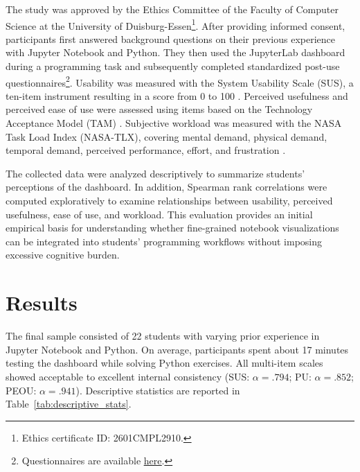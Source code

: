 \documentclass[sigconf]{acmart}
\begin{document}
The study was approved by the Ethics Committee of the Faculty of Computer Science at the University of Duisburg-Essen\footnote{Ethics certificate ID: 2601CMPL2910.}. After providing informed consent, participants first answered background questions on their previous experience with Jupyter Notebook and Python. They then used the JupyterLab dashboard during a programming task and subsequently completed standardized post-use questionnaires\footnote{Questionnaires are available \href{https://git.uni-due.de/colaps/la-rp/group-4/la-extension/-/raw/master/MUC\%20-\%20StudentResearchCompetition/Questionaire.pdf?ref_type=heads&inline=true}{\color{blue}\underline{here}}.}. Usability was measured with the System Usability Scale (SUS), a ten-item instrument resulting in a score from 0 to 100 \cite{germanupa_sus}. Perceived usefulness and perceived ease of use were assessed using items based on the Technology Acceptance Model (TAM) \cite{davis1989technology}. Subjective workload was measured with the NASA Task Load Index (NASA-TLX), covering mental demand, physical demand, temporal demand, perceived performance, effort, and frustration \cite{hart1988development}.

The collected data were analyzed descriptively to summarize students' perceptions of the dashboard. In addition, Spearman rank correlations were computed exploratively to examine relationships between usability, perceived usefulness, ease of use, and workload. This evaluation provides an initial empirical basis for understanding whether fine-grained notebook visualizations can be integrated into students' programming workflows without imposing excessive cognitive burden.

\section{Results}
The final sample consisted of 22 students with varying prior experience in Jupyter Notebook and Python. On average, participants spent about 17 minutes testing the dashboard while solving Python exercises. All multi-item scales showed acceptable to excellent internal consistency (SUS: $\alpha=.794$; PU: $\alpha=.852$; PEOU: $\alpha=.941$). Descriptive statistics are reported in Table~\ref{tab:descriptive_stats}.
\end{document}
